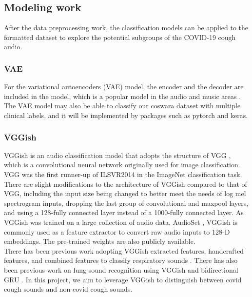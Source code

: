 \documentclass[11pt]{article}
\begin{document}
\subsection{Modeling work}
After the data preprocessing work, the classification models can be applied to the formatted 
dataset to explore the potential subgroups of the COVID-19 cough audio.

\subsubsection{VAE}
For the variational autoencoders (VAE) model,
the encoder and the decoder are included in the model, which is a popular model in the audio and
music areas \cite{girin2020dynamical}. The VAE model may also be able to classify our coswara dataset with multiple
clinical labels, and it will be implemented by packages such as pytorch and keras.

\subsubsection{VGGish}
VGGish \cite{Chao1st} is an audio classification model that adopts the structure of VGG \cite{Chao2nd}, which is a
convolutional neural network originally used for image classification. VGG was the first runner-up of
ILSVR2014 in the ImageNet classification task. There are slight modifications to the architecture of
VGGish compared to that of VGG, including the input size being changed to better meet the needs of
log mel spectrogram inputs, dropping the last group of convolutional and maxpool layers, and using
a 128-fully connected layer instead of a 1000-fully connected layer. As VGGish was trained on a large
collection of audio data, AudioSet \cite{Chao3rd}, VGGish is commonly used as a feature extractor to convert
raw audio inputs to 128-D embeddings. The pre-trained weights are also publicly available. \\

\noindent
There has been previous work adopting VGGish extracted features, handcrafted features, and combined
 features to classify respiratory sounds \cite{Chao1st}. There has also been previous work on lung sound
 recognition using VGGish and bidirectional GRU \cite{Chao5th}. In this project, we aim to leverage VGGish to
 distinguish between covid cough sounds and non-covid cough sounds.
\end{document}
